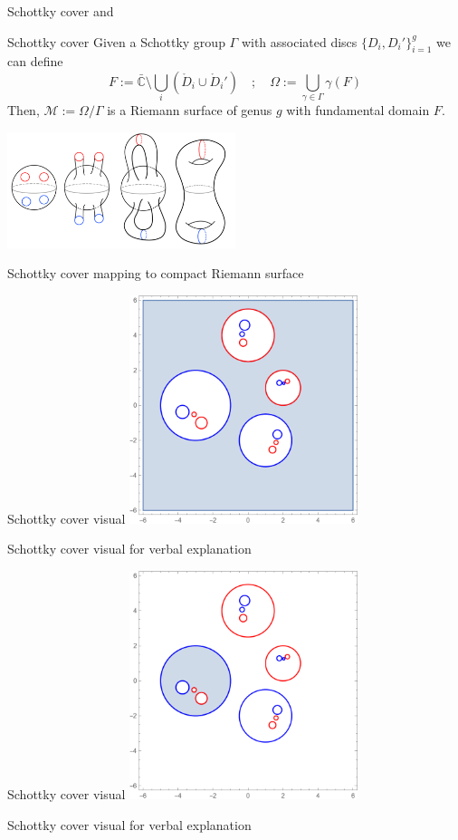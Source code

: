 \documentclass[11pt,aspectratio=169]{beamer}
\begin{document}
\begin{frame}{Schottky cover}{\tiny \cite{ComputationalSchottky} and \cite{Cha22}}
    \begin{block}{Schottky cover}
        Given a Schottky group $\Gamma$ with associated discs $\{D_i,D_i'\}_{i=1}^g$ we can define
        \[F := \bar {\mathbb C} \setminus \bigcup_i (\mathring{D}_i \cup \mathring{D}_i') \quad ; \quad \Omega := \bigcup_{\gamma \in \Gamma} \gamma(F)\]
        Then, $\mathcal M := \Omega / \Gamma$ is a Riemann surface of genus $g$ with fundamental domain $F$.
    \end{block}
    \center{}
    \includegraphics[width=0.5\textwidth]{assets/ChanSchottkyCover.png}

    \tiny Schottky cover mapping to compact Riemann surface

    \cite{Cha22}
\end{frame}

\begin{frame}{Schottky cover visual}
    \center{}
    \includegraphics[width=0.5\textwidth]{assets/Genus2SchottkyOuter.png}

    \tiny Schottky cover visual for verbal explanation
\end{frame}

\begin{frame}[noframenumbering]{Schottky cover visual}
    \center{}
    \includegraphics[width=0.5\textwidth]{assets/Genus2SchottkyInner.png}

    \tiny Schottky cover visual for verbal explanation
\end{frame}
\end{document}
